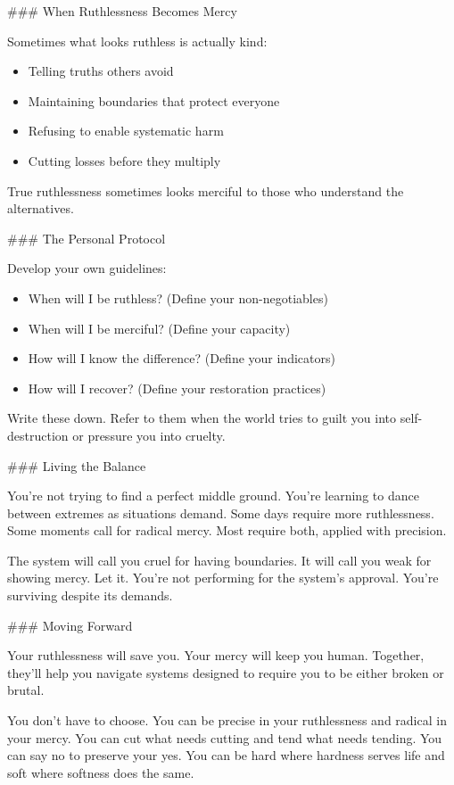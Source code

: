 \documentclass[12pt]{book}
\begin{document}
\#\#\# When Ruthlessness Becomes Mercy

Sometimes what looks ruthless is actually kind:

\begin{itemize}
\item Telling truths others avoid
\item Maintaining boundaries that protect everyone
\item Refusing to enable systematic harm
\item Cutting losses before they multiply

\end{itemize}
True ruthlessness sometimes looks merciful to those who understand the alternatives.

\#\#\# The Personal Protocol

Develop your own guidelines:

\begin{itemize}
\item When will I be ruthless? (Define your non-negotiables)
\item When will I be merciful? (Define your capacity)
\item How will I know the difference? (Define your indicators)
\item How will I recover? (Define your restoration practices)

\end{itemize}
Write these down. Refer to them when the world tries to guilt you into self-destruction or pressure you into cruelty.

\#\#\# Living the Balance

You're not trying to find a perfect middle ground. You're learning to dance between extremes as situations demand. Some days require more ruthlessness. Some moments call for radical mercy. Most require both, applied with precision.

The system will call you cruel for having boundaries. It will call you weak for showing mercy. Let it. You're not performing for the system's approval. You're surviving despite its demands.

\#\#\# Moving Forward

Your ruthlessness will save you. Your mercy will keep you human. Together, they'll help you navigate systems designed to require you to be either broken or brutal.

You don't have to choose. You can be precise in your ruthlessness and radical in your mercy. You can cut what needs cutting and tend what needs tending. You can say no to preserve your yes. You can be hard where hardness serves life and soft where softness does the same.
\end{document}
